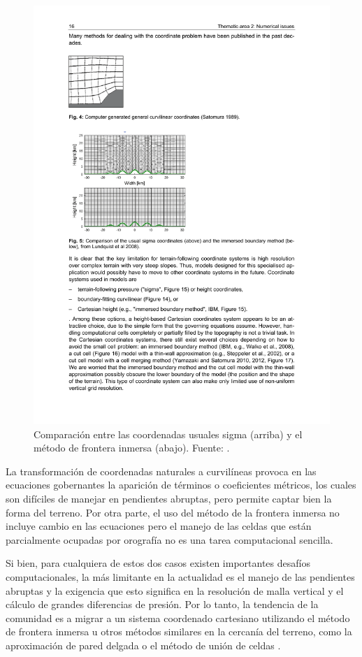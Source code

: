 \begin{figure}[h!]
	\centering
	\includegraphics[width=0.8\linewidth,trim={2.6cm 13.5cm 9.2cm 9cm},clip]{Imagenes/02/coordinates}
	\caption{Comparación entre las coordenadas usuales sigma (arriba) y el método de frontera inmersa (abajo). Fuente: \cite{arnold2012high}.}
	\label{fig:02_coordinates}
\end{figure}
La transformación de coordenadas naturales a curvilíneas provoca en las ecuaciones gobernantes la aparición de términos o coeficientes métricos, los cuales son difíciles de manejar en pendientes abruptas, pero permite captar bien la forma del terreno. Por otra parte, el uso del método de la frontera inmersa no incluye cambio en las ecuaciones pero el manejo de las celdas que están parcialmente ocupadas por orografía no es una tarea computacional sencilla.

Si bien, para cualquiera de estos dos casos existen importantes desafíos computacionales, la más limitante en la actualidad es el manejo de las pendientes abruptas y la exigencia que esto significa en la resolución de malla vertical y el cálculo de grandes diferencias de presión. Por lo tanto, la tendencia de la comunidad es a migrar a un sistema coordenado cartesiano utilizando el método de frontera inmersa u otros métodos similares en la cercanía del terreno, como la aproximación de pared delgada \citep{steppeler2002nonhydrostatic} o el método de unión de celdas \citep{yamazaki2010nonhydrostatic,yamazaki2012non}.

